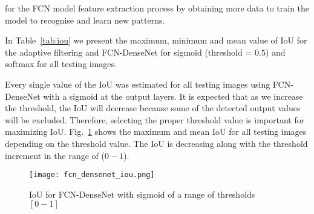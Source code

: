 \DIFaddend for the FCN model \DIFdelbegin {}\DIFdelend \DIFaddbegin {}\DIFaddend feature extraction process by obtaining more data to train the model to recognise and learn new patterns.

In Table~\ref{tab:iou} we present the maximum, minimum and mean value of IoU for the adaptive filtering and FCN-DenseNet for sigmoid (threshold = \(0.5\)) and softmax for all testing images.
\DIFaddbegin {}\DIFaddend \begin{table}
	 \renewcommand{\arraystretch}{1.3}
		\centering
		\caption{IoU for all models}
		\label{tab:iou}
	\end{table}

Every single value of the IoU was estimated for all testing images using FCN-DenseNet with a sigmoid at the output layers.
It is expected that as we increase the threshold, the IoU will decrease because some of the detected output values will be excluded.
Therefore, selecting the proper threshold value is important for maximizing IoU\DIFaddbegin {}\DIFaddend . 
Fig.~\ref{fig:iou_fcn} shows the maximum and mean IoU for all testing images depending on the threshold value. 
The IoU is decreasing along with the threshold increment in the range of (\(0-1\)).
	\begin{figure}[!h] 
		\centering
		\texttt{[image: fcn\_densenet\_iou.png]}
		\centering
		\caption{IoU for FCN-DenseNet with sigmoid of a range of thresholds \([0-1]\)} 
		\label{fig:iou_fcn}
	\end{figure}

